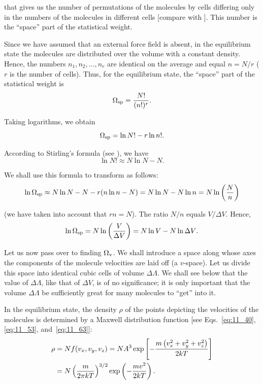 \noindent
that gives us the number of permutations of the molecules by cells differing only in the numbers of the molecules in different cells [compare with ]. This number is the ``space'' part of the statistical weight.

Since we have assumed that an external force field is absent, in the equilibrium state the molecules are distributed over the volume with a constant density. Hence, the numbers $n_1, n_2, \ldots, n_r$ are identical on the average and equal $n=N/r$ ($r$ is the number of cells). Thus, for the equilibrium state, the ``space'' part of the statistical weight is
\begin{equation*}
	\Omega_{\text{sp}} = \frac{N!}{(n!)^r}.
\end{equation*}

\noindent
Taking logarithms, we obtain
\begin{equation}\label{eq:11_99}
	\Omega_{\text{sp}} = \ln{N!} - r\ln{n!}.
\end{equation}

\noindent
According to Stirling's formula (see ), we have
\begin{equation}\label{eq:11_100}
	\ln{N!} \approx N\ln{N} - N.
\end{equation}

\noindent
We shall use this formula to transform  as follows:
\begin{equation*}
	\ln{\Omega_{\text{sp}}} \approx N\ln{N} - N - r(n\ln{n} - N) = N\ln{N} - N\ln{n} = N\ln\left(\frac{N}{n}\right)
\end{equation*}

\noindent
(we have taken into account that $rn=N$). The ratio $N/n$ equals $V/\Delta V$. Hence,
\begin{equation}\label{eq:11_101}
	\ln{\Omega_{\text{sp}}} = N\ln\left(\frac{V}{\Delta V}\right) = N\ln{V} - N\ln{\Delta V}.
\end{equation}

Let us now pass over to finding $\Omega_{\text{v}}$. We shall introduce a space along whose axes the components of the molecule velocities are laid off (a $v$-space). Let us divide this space into identical cubic cells of volume $\Delta\Lambda$. We shall see below that the value of $\Delta\Lambda$, like that of $\Delta V$, is of no significance; it is only important that the volume $\Delta\Lambda$ be sufficiently great for many molecules to ``get'' into it.

In the equilibrium state, the density $\rho$ of the points depicting the velocities of the molecules is determined by a Maxwell distribution function [see Eqs.~\eqref{eq:11_40}, \eqref{eq:11_53}, and~\eqref{eq:11_63}]:
\begin{align*}
	\rho &= N f(v_x, v_y, v_z) = NA^3 \exp\left[-\frac{m\left(v_x^2+v_y^2+v_z^2\right)}{2kT}\right]\\
	& = N \left(\frac{m}{2\pi kT}\right)^{3/2} \exp\left(-\frac{mv^2}{2kT}\right).
\end{align*}


